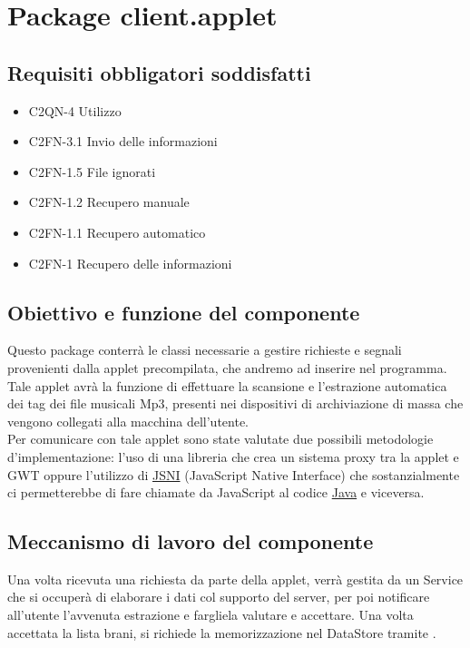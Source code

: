 \newpage
\section{Package client.applet} %
\subsection*{Requisiti obbligatori soddisfatti}
\begin{itemize}
	\item C2QN-4 Utilizzo
	\item C2FN-3.1 Invio delle informazioni
	\item C2FN-1.5 File ignorati
	\item C2FN-1.2 Recupero manuale
	\item C2FN-1.1 Recupero automatico
	\item C2FN-1 Recupero delle informazioni
\end{itemize}
\subsection*{Obiettivo e funzione del componente}
Questo package conterr\`a le classi necessarie a gestire richieste e segnali
provenienti dalla applet precompilata, che andremo ad inserire nel programma.
Tale applet avr\`a la funzione di effettuare la scansione e l'estrazione
automatica dei tag dei file musicali Mp3, presenti nei dispositivi di
archiviazione di massa che vengono collegati alla macchina dell'utente.\\
Per comunicare con tale applet sono state valutate due possibili metodologie
d'implementazione: l'uso di una libreria che crea un sistema proxy tra la applet
e GWT oppure l'utilizzo di \underline{JSNI} (JavaScript Native Interface) che
sostanzialmente ci permetterebbe di fare chiamate da JavaScript al codice
\underline{Java} e viceversa.

\subsection*{Meccanismo di lavoro del componente}
Una volta ricevuta una richiesta da parte della applet, verr\`a gestita da un
Service che si occuper\`a di elaborare i dati col supporto del server, per poi
notificare all'utente l'avvenuta estrazione e fargliela valutare e accettare.
Una volta accettata la lista brani, si richiede la memorizzazione nel DataStore
tramite .

